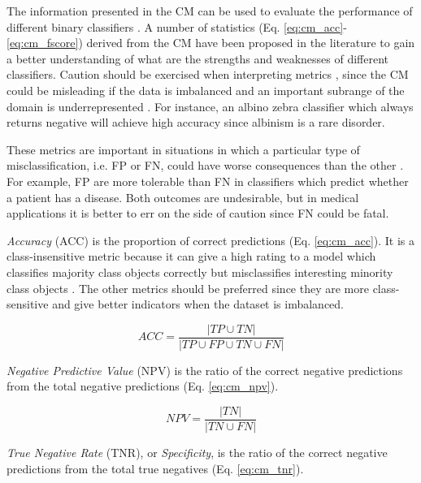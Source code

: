 The information presented in the CM can be used to evaluate the performance of different binary classifiers \citep{lu2004predicting}. A number of statistics (Eq. \ref{eq:cm_acc}-\ref{eq:cm_fscore}) derived from the CM have been proposed in the literature \citep{deng2016improved} to gain a better understanding of what are the strengths and weaknesses of different classifiers. Caution should be exercised when interpreting metrics \citep{jeni2013facing}, since the CM could be misleading if the data is imbalanced and an important subrange of the domain is underrepresented \citep{raeder2012learning}. For instance, an albino zebra classifier which always returns negative will achieve high accuracy since albinism is a rare disorder.

These metrics are important in situations in which a particular type of misclassification, i.e. FP or FN, could have worse consequences than the other \citep{hassanien2017advances}. For example, FP are more tolerable than FN in classifiers which predict whether a patient has a disease. Both outcomes are undesirable, but in medical applications it is better to err on the side of caution since FN could be fatal.

\textit{Accuracy} (ACC) is the proportion of correct predictions (Eq. \ref{eq:cm_acc}). It is a class-insensitive metric because it can give a high rating to a model which classifies majority class objects correctly but misclassifies interesting minority class objects \citep{branco2016survey}. The other metrics should be preferred since they are more class-sensitive and give better indicators when the dataset is imbalanced.

\begin{equation}
\label{eq:cm_acc}
ACC = \frac{|TP \cup TN|}{|TP \cup FP \cup TN \cup FN|}
\end{equation}

\textit{Negative Predictive Value} (NPV) is the ratio of the correct negative predictions from the total negative predictions (Eq. \ref{eq:cm_npv}).

\begin{equation}
\label{eq:cm_npv}
NPV = \frac{|TN|}{|TN \cup FN|}
\end{equation}

\textit{True Negative Rate} (TNR), or \textit{Specificity}, is the ratio of the correct negative predictions from the total true negatives (Eq. \ref{eq:cm_tnr}).

